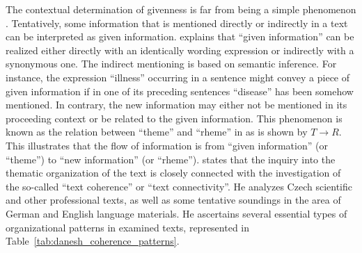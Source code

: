 The contextual determination of givenness is far from being a simple phenomenon \cite{danes74a}. 
Tentatively, some information that is mentioned directly or indirectly in a text can be interpreted as given information. 
 explains that ``given information'' can be realized either directly with an identically wording expression or indirectly with a synonymous one.   
The indirect mentioning is based on semantic inference. 
For instance, the expression ``illness'' occurring in a sentence might convey a piece of given information if in one of its preceding sentences ``disease'' has been somehow mentioned. 
In contrary, the new information may either not be mentioned in its proceeding context or be related to the given information. 
This phenomenon is known as the relation between ``theme'' and ``rheme'' in  as is shown by  $T \rightarrow R$. 
This illustrates that the flow of information is from ``given information'' (or ``theme'') to ``new information'' (or ``rheme'').
 states that the inquiry into the thematic organization of the text is closely connected with the investigation of the so-called ``text coherence'' or ``text connectivity''.
He analyzes Czech scientific and other professional texts, as well as some tentative soundings in the area of German and English language materials.
He ascertains several essential types of organizational patterns in examined texts, represented in Table~\ref{tab:danesh_coherence_patterns}. 
%

